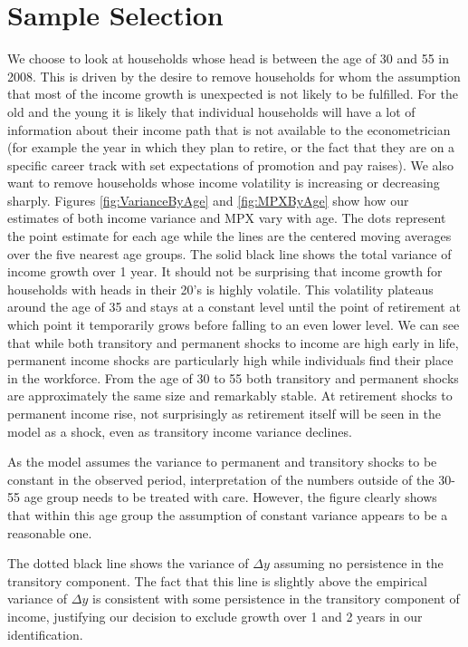 \documentclass[titlepage]{\econtex}\newcommand{\texname}{ConsumptionHeterogeneity}
\begin{document}
\section{Sample Selection} \label{sample_selection}
\setcounter{figure}{0}   
\setcounter{table}{0} 
We choose to look at households whose head is between the age of 30 and 55 in 2008. This is driven by the desire to remove households for whom the assumption that most of the income growth is unexpected is not likely to be fulfilled. For the old and the young it is likely that individual households will have a lot of information about their income path that is not available to the econometrician (for example the year in which they plan to retire, or the fact that they are on a specific career track with set expectations of promotion and pay raises). We also want to remove households whose income volatility is increasing or decreasing sharply. Figures \ref{fig:VarianceByAge} and \ref{fig:MPXByAge} show how our estimates of both income variance and MPX vary with age. The dots represent the point estimate for each age while the lines are the centered moving averages over the five nearest age groups. The solid black line shows the total variance of income growth over 1 year. It should not be surprising that income growth for households with heads in their 20's is highly volatile. This volatility plateaus around the age of 35 and stays at a constant level until the point of retirement at which point it temporarily grows before falling to an even lower level. We can see that while both transitory and permanent shocks to income are high early in life, permanent income shocks are particularly high while individuals find their place in the workforce. From the age of 30 to 55 both transitory and permanent shocks are approximately the same size and remarkably stable. At retirement shocks to permanent income rise, not surprisingly as retirement itself will be seen in the model as a shock, even as transitory income variance declines.

As the model assumes the variance to permanent and transitory shocks to be constant in the observed period, interpretation of the numbers outside of the 30-55 age group needs to be treated with care. However, the figure clearly shows that within this age group the assumption of constant variance appears to be a reasonable one.

The dotted black line shows the variance of $\Delta y$ assuming no persistence in the transitory component. The fact that this line is slightly above the empirical variance of $\Delta y$ is consistent with some persistence in the transitory component of income, justifying our decision to exclude growth over 1 and 2 years in our identification.
\end{document}
